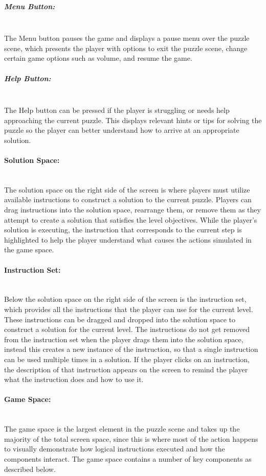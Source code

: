 		\subparagraph{Menu Button:} ~\\
		The Menu button pauses the game and displays a pause menu over the puzzle scene, which presents the player with options to exit the puzzle scene, change certain game options such as volume, and resume the game.

		\subparagraph{Help Button:} ~\\
		The Help button can be pressed if the player is struggling or needs help approaching the current puzzle. This displays relevant hints or tips for solving the puzzle so the player can better understand how to arrive at an appropriate solution.


	\paragraph{Solution Space:} ~\\
	The solution space on the right side of the screen is where players must utilize available instructions to construct a solution to the current puzzle. Players can drag instructions into the solution space, rearrange them, or remove them as they attempt to create a solution that satisfies the level objectives.
	While the player's solution is executing, the instruction that corresponds to the current step is highlighted to help the player understand what causes the actions simulated in the game space.

	\paragraph{Instruction Set:} ~\\
	Below the solution space on the right side of the screen is the instruction set, which provides all the instructions that the player can use for the current level.
	These instructions can be dragged and dropped into the solution space to construct a solution for the current level.
	The instructions do not get removed from the instruction set when the player drags them into the solution space, instead this creates a new instance of the instruction, so that a single instruction can be used multiple times in a solution.
	If the player clicks on an instruction, the description of that instruction appears on the screen to remind the player what the instruction does and how to use it.


	\paragraph{Game Space:} ~\\
	The game space is the largest element in the puzzle scene and takes up the majority of the total screen space, since this is where most of the action happens to visually demonstrate how logical instructions executed and how the components interact. The game space contains a number of key components as described below.

